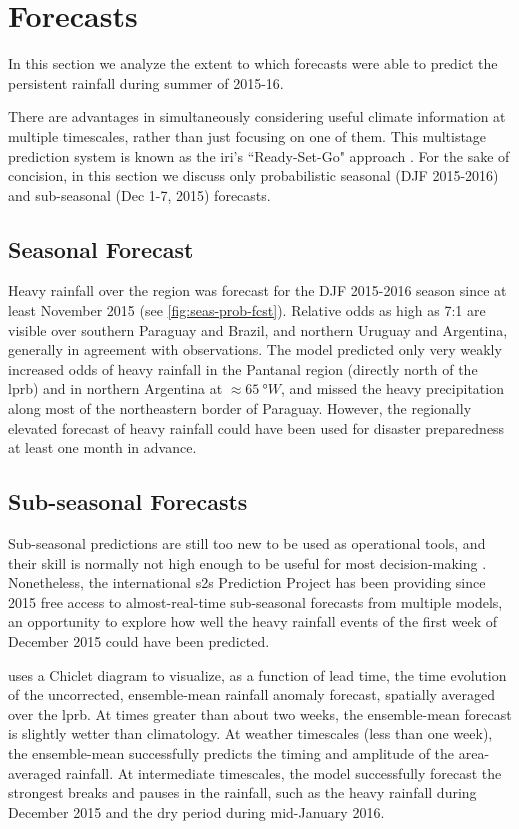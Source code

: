 \documentclass[twocol]{ametsoc}
\begin{document}
\section{Forecasts} \label{sec:fcsts}

In this section we analyze the extent to which forecasts were able to predict the persistent rainfall during summer of 2015-16.

There are advantages in simultaneously considering useful climate information at multiple timescales, rather than just focusing on one of them.
This multistage prediction system is known as the \gls{iri}'s ``Ready-Set-Go" approach \citep{Hellmuth2011,Goddard2014}.
For the sake of concision, in this section we discuss only probabilistic seasonal (DJF 2015-2016) and sub-seasonal (Dec 1-7, 2015) forecasts.

\subsection{Seasonal Forecast}

Heavy rainfall over the region was forecast for the DJF 2015-2016 season since at least November 2015 (see \cref{fig:seas-prob-fcst}).
Relative odds as high as 7:1 are visible over southern Paraguay and Brazil, and northern Uruguay and Argentina, generally in agreement with observations.
The model predicted only very weakly increased odds of heavy rainfall in the Pantanal region (directly north of the \gls{lprb}) and in northern Argentina at $\approx \SI{65}{\degree W}$, and missed the heavy precipitation along most of the northeastern border of Paraguay.
However, the regionally elevated forecast of heavy rainfall could have been used for disaster preparedness at least one month in advance.

\subsection{Sub-seasonal Forecasts}

Sub-seasonal predictions are still too new to be used as operational tools, and their skill is normally not high enough to be useful for most decision-making \citep{Vigaud2017}.
Nonetheless, the international \gls{s2s} Prediction Project \citep{Vitart2016} has been providing since 2015 free access to almost-real-time sub-seasonal forecasts from multiple models, an opportunity to explore how well the heavy rainfall events of the first week of December 2015 could have been predicted.

 uses a Chiclet diagram \citep{Carbin2016} to visualize, as a function of lead time, the time evolution of the uncorrected, ensemble-mean rainfall anomaly forecast, spatially averaged over the \gls{lprb}.
At times greater than about two weeks, the ensemble-mean forecast is slightly wetter than climatology.
At weather timescales (less than one week), the ensemble-mean successfully predicts the timing and amplitude of the area-averaged rainfall.
At intermediate timescales, the model successfully forecast the strongest breaks and pauses in the rainfall, such as the heavy rainfall during December 2015 and the dry period during mid-January 2016.
\end{document}
